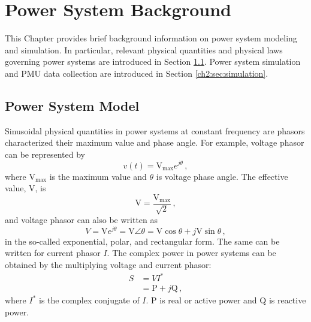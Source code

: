 
\chapter{Power System Background}
\label{ch:ps_background}
\vspace{2em}

This Chapter provides brief background information on power system modeling and simulation. In particular, relevant physical quantities and physical laws governing power systems are introduced in Section \ref{ch2:sec:ps_model}. Power system simulation and PMU data collection are introduced in Section \ref{ch2:sec:simulation}.

\section{Power System Model}
\label{ch2:sec:ps_model}

Sinusoidal physical quantities in power systems at constant frequency are phasors characterized their maximum value and phase angle. For example, voltage phasor can be represented by
\begin{equation}
    v(t) = \text{V}_{\text{max}}e^{j\theta} \,,
\end{equation}
where $\text{V}_{\text{max}}$ is the maximum value and $\theta$ is voltage phase angle. The effective value, $\text{V}$, is 
\begin{equation}
    \text{V} = \frac{\text{V}_{\text{max}}}{\sqrt{2}} \,,
\end{equation}
and voltage phasor can also be written as 
\begin{equation}
    V = \text{V}e^{j\theta} = \text{V}\angle\theta = \text{V}\cos\theta + j\text{V}\sin\theta \,,
\end{equation}
in the so-called exponential, polar, and rectangular form. The same can be written for current phasor $I$. The complex power in power systems can be obtained by the multiplying voltage and current phasor:
\begin{align}
    S &= VI^* \\
      &= \text{P} + j\text{Q} \,,
\end{align}
where $I^*$ is the complex conjugate of $I$. $\text{P}$ is real or active power and $\text{Q}$ is reactive power. 

